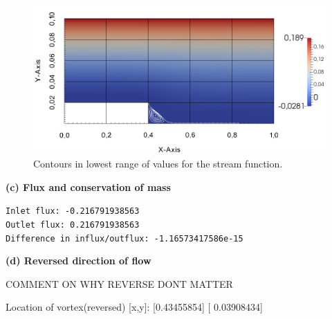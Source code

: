 \documentclass[11pt,a4paper,english]{article}
\numberwithin{equation}{section}
\begin{document}
\vspace{1.5cm}
\begin{figure}[h!]
\begin{center}
  \includegraphics[scale=0.35]{psi_step.png}
  \end{center}
  \caption{Contours in lowest range of values for the stream function.}
\end{figure}

\textbf{(c) Flux and conservation of mass}

\noindent
\texttt{Inlet flux:  -0.216791938563} \\
\texttt{Outlet flux:  0.216791938563} \\
\texttt{Difference in influx/outflux: -1.16573417586e-15}


\textbf{(d) Reversed direction of flow}

COMMENT ON WHY REVERSE DONT MATTER

Location of vortex(reversed) [x,y]:  [0.43455854] [ 0.03908434]
\end{document}
